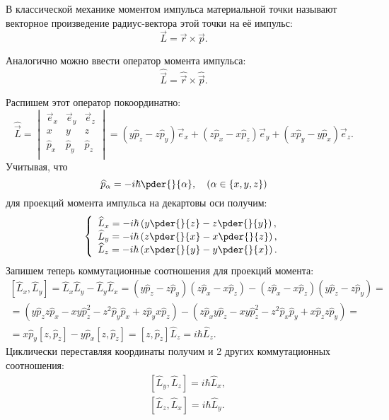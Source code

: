 
В классической механике моментом импульса материальной точки называют векторное
произведение радиус-вектора этой точки на её импульс:
\[
    \vec{L} = \vec{r}\times\vec{p}.
\]

Аналогично можно ввести оператор момента импульса:
\[
    \hat{\vec{L}} = \hat{\vec{r}}\times\hat{\vec{p}}.
\]

Распишем этот оператор покоординатно:
\[
    \hat{\vec{L}} =
    \begin{vmatrix}
        \vec{e}_x & \vec{e}_y & \vec{e}_z \\
        x         & y         & z         \\
        \hat{p}_x & \hat{p}_y & \hat{p}_z \\
    \end{vmatrix} =
    (y\hat{p}_z - z\hat{p}_y)\vec{e}_x +
    (z\hat{p}_x - x\hat{p}_z)\vec{e}_y +
    (x\hat{p}_y - y\hat{p}_x)\vec{e}_z.
\]
Учитывая, что
\[
    \hat{p}_\alpha = -i\hbar\pder{}{\alpha}, \quad (\alpha \in \{ x,y,z \})
\]
для проекций момента импульса на декартовы оси получим:
\[
    \left\{
        \begin{array}{l}
            \hat{L}_x = -i\hbar\left( y\pder{}{z} - z\pder{}{y} \right),\\
            \hat{L}_y = -i\hbar\left( z\pder{}{x} - x\pder{}{z} \right),\\
            \hat{L}_z = -i\hbar\left( x\pder{}{y} - y\pder{}{x} \right).\\
        \end{array}
    \right.
\]
Запишем теперь коммутационные соотношения для проекций момента:
\begin{gather*}
    \left[\hat{L}_x, \hat{L}_y\right] = \hat{L}_x\hat{L}_y - \hat{L}_y\hat{L}_x=
    (y\hat{p}_z - z\hat{p}_y)(z\hat{p}_x - x\hat{p}_z) -
    (z\hat{p}_x - x\hat{p}_z)(y\hat{p}_z - z\hat{p}_y) =\\
    =(y\hat{p}_z z\hat{p}_x - xy\hat{p}_z^2 - z^2\hat{p}_y\hat{p}_x +
    z\hat{p}_y x\hat{p}_z) -
    (z\hat{p}_x y\hat{p}_z - xy\hat{p}_z^2 - z^2\hat{p}_x\hat{p}_y +
    x\hat{p}_z z\hat{p}_y) =\\
    =x\hat{p}_y [z, \hat{p}_z] - y\hat{p}_x[z, \hat{p}_z]=
    [z, \hat{p}_z]\hat{L}_z = i\hbar\hat{L}_z.
\end{gather*}
Циклически переставляя координаты получим и 2 других коммутационных соотношения:
\begin{align*}
    & \left[\hat{L}_y, \hat{L}_z\right] = i\hbar\hat{L}_x,\\
    & \left[\hat{L}_z, \hat{L}_x\right] = i\hbar\hat{L}_y.
\end{align*}

